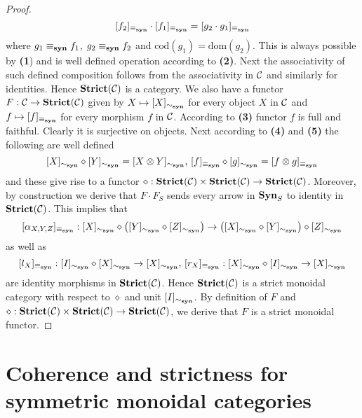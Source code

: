\begin{proof}
$$[f_2]_{\equiv_{\mathbf{syn}}}\cdot [f_1]_{\equiv_{\mathbf{syn}}} = [g_2\cdot g_1]_{\equiv_{\mathbf{syn}}}$$
where $g_1\equiv_{\mathbf{syn}} f_1$, $g_2\equiv_{\mathbf{syn}} f_2$ and $\mathrm{cod}(g_1) = \mathrm{dom}(g_2)$. This is always possible by \textbf{(1}) and is well defined operation according to \textbf{(2)}. Next the associativity of such defined composition follows from the associativity in ${\mathcal C}$ and similarly for identities. Hence $\mathbf{Strict}({\mathcal C})$ is a category. We also have a functor $F:{\mathcal C}\rightarrow \mathbf{Strict}({\mathcal C})$ given by $X\mapsto [X]_{\sim_{\mathbf{syn}}}$ for every object $X$ in ${\mathcal C}$ and $f\mapsto [f]_{\equiv_{\mathbf{syn}}}$ for every morphism $f$ in ${\mathcal C}$. According to \textbf{(3)} functor $f$ is full and faithful. Clearly it is surjective on objects. Next according to \textbf{(4)} and \textbf{(5)} the following are well defined
$$[X]_{\sim_{\mathbf{syn}}}\diamond [Y]_{\sim_{\mathbf{syn}}} = [X\otimes Y]_{\sim_{\mathbf{syn}}},\,[f]_{\equiv_{\mathbf{syn}}}\diamond [g]_{\sim_{\mathbf{syn}}} = [f\otimes g]_{\equiv_{\mathbf{syn}}}$$
and these give rise to a functor $\diamond:\mathbf{Strict}({\mathcal C})\times \mathbf{Strict}({\mathcal C})\rightarrow \mathbf{Strict}({\mathcal C})$. Moreover, by construction we derive that $F\cdot F_S$ sends every arrow in $\mathbf{Syn}_S$ to identity in $\mathbf{Strict}({\mathcal C})$. This implies that
$$[\alpha_{X,Y,Z}]_{\equiv_{\mathbf{syn}}}:[X]_{\sim_{\mathbf{syn}}}\diamond \left([Y]_{\sim_{\mathbf{syn}}}\diamond [Z]_{\sim_{\mathbf{syn}}}\right)\rightarrow \left([X]_{\sim_{\mathbf{syn}}}\diamond [Y]_{\sim_{\mathbf{syn}}}\right)\diamond [Z]_{\sim_{\mathbf{syn}}}$$
as well as
$$[l_X]_{\equiv_{\mathbf{syn}}}:[I]_{\sim_{\mathbf{syn}}}\diamond [X]_{\sim_{\mathbf{syn}}}\rightarrow [X]_{\sim_{\mathbf{syn}}},\,[r_X]_{\equiv_{\mathbf{syn}}}:[X]_{\sim_{\mathbf{syn}}}\diamond [I]_{\sim_{\mathbf{syn}}}\rightarrow [X]_{\sim_{\mathbf{syn}}}$$
are identity morphisms in $\mathbf{Strict}({\mathcal C})$. Hence $\mathbf{Strict}({\mathcal C})$ is a strict monoidal category with respect to $\diamond$ and unit $[I]_{\sim_{\mathbf{syn}}}$. By definition of $F$ and $\diamond:\mathbf{Strict}({\mathcal C})\times \mathbf{Strict}({\mathcal C})\rightarrow \mathbf{Strict}({\mathcal C})$, we derive that $F$ is a strict monoidal functor.
\end{proof}

\section{Coherence and strictness for symmetric monoidal categories}


